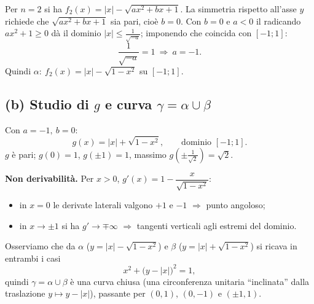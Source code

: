\documentclass[11pt]{article}
\begin{document}
Per $n=2$ si ha $f_2(x)=|x|-\sqrt{ax^2+bx+1}$. La simmetria rispetto all'asse $y$
richiede che $\sqrt{ax^2+bx+1}$ sia pari, cio\`e $\boxed{b=0}$. Con $b=0$ e $a<0$ il
radicando $ax^2+1\ge0$ d\`a il dominio $|x|\le\frac{1}{\sqrt{-a}}$; imponendo che
coincida con $[-1;1]$:
\[
\frac{1}{\sqrt{-a}}=1\ \Longrightarrow\ \boxed{a=-1}.
\]
Quindi $\alpha\colon\ f_2(x)=|x|-\sqrt{1-x^2}$ su $[-1;1]$.

\subsection*{(b) Studio di \texorpdfstring{$g$}{g} e curva \texorpdfstring{$\gamma=\alpha\cup\beta$}{gamma}}

Con $a=-1,\ b=0$:
\[
g(x)=|x|+\sqrt{1-x^2},\qquad \text{dominio } [-1;1].
\]
$g$ \`e pari; $g(0)=1$, $g(\pm1)=1$, massimo $g\!\left(\pm\tfrac{1}{\sqrt2}\right)=\sqrt2$.

\textbf{Non derivabilit\`a.} Per $x>0$, $g'(x)=1-\dfrac{x}{\sqrt{1-x^2}}$:
\begin{itemize}[itemsep=0.1cm]
  \item in $x=0$ le derivate laterali valgono $+1$ e $-1$ $\Rightarrow$ punto angoloso;
  \item in $x\to\pm1$ si ha $g'\to\mp\infty$ $\Rightarrow$ tangenti verticali agli
        estremi del dominio.
\end{itemize}

Osserviamo che da $\alpha$ ($y=|x|-\sqrt{1-x^2}$) e $\beta$ ($y=|x|+\sqrt{1-x^2}$)
si ricava in entrambi i casi
\[
x^2+\bigl(y-|x|\bigr)^2=1,
\]
quindi $\gamma=\alpha\cup\beta$ \`e una curva chiusa (una circonferenza unitaria
``inclinata'' dalla traslazione $y\mapsto y-|x|$), passante per $(0,1)$, $(0,-1)$ e
$(\pm1,1)$.

\begin{center}
\end{center}
\end{document}
